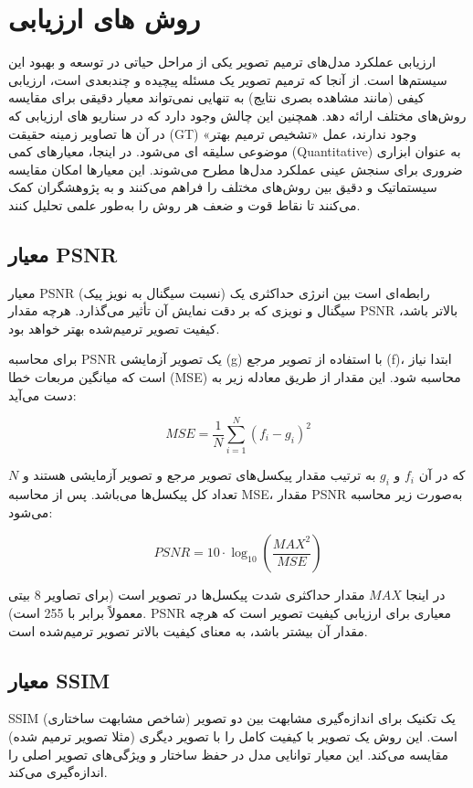 \section{روش های ارزیابی}

ارزیابی عملکرد مدل‌های ترمیم تصویر یکی از مراحل حیاتی در توسعه و بهبود این سیستم‌ها است. از آنجا که ترمیم تصویر یک مسئله پیچیده و چندبعدی است، ارزیابی کیفی (مانند مشاهده بصری نتایج) به تنهایی نمی‌تواند معیار دقیقی برای مقایسه روش‌های مختلف ارائه دهد. همچنین این چالش وجود دارد که در سناریو های ارزیابی که در آن ها تصاویر زمینه حقیقت (GT) وجود ندارند، عمل «تشخیص ترمیم بهتر» موضوعی سلیقه ای می‌شود. در اینجا، معیارهای کمی (Quantitative) به عنوان ابزاری ضروری برای سنجش عینی عملکرد مدل‌ها مطرح می‌شوند. این معیارها امکان مقایسه سیستماتیک و دقیق بین روش‌های مختلف را فراهم می‌کنند و به پژوهشگران کمک می‌کنند تا نقاط قوت و ضعف هر روش را به‌طور علمی تحلیل کنند.
\subsection{معیار PSNR}
معیار PSNR (نسبت سیگنال به نویز پیک) رابطه‌ای است بین انرژی حداکثری یک سیگنال و نویزی که بر دقت نمایش آن تأثیر می‌گذارد. هرچه مقدار PSNR بالاتر باشد، کیفیت تصویر ترمیم‌شده بهتر خواهد بود.

برای محاسبه PSNR یک تصویر آزمایشی (g) با استفاده از تصویر مرجع (f)، ابتدا نیاز است که میانگین مربعات خطا (MSE) محاسبه شود. این مقدار از طریق معادله زیر به دست می‌آید:

\[
MSE = \frac{1}{N} \sum_{i=1}^{N} (f_i - g_i)^2
\]

که در آن $f_i$ و $g_i$ به ترتیب مقدار پیکسل‌های تصویر مرجع و تصویر آزمایشی هستند و $N$ تعداد کل پیکسل‌ها می‌باشد. پس از محاسبه MSE، مقدار PSNR به‌صورت زیر محاسبه می‌شود:

\begin{equation}
	PSNR = 10 \cdot \log_{10}\left(\frac{MAX^2}{MSE}\right)
\end{equation}

در اینجا $MAX$ مقدار حداکثری شدت پیکسل‌ها در تصویر است (برای تصاویر 8 بیتی معمولاً برابر با 255 است). PSNR معیاری برای ارزیابی کیفیت تصویر است که هرچه مقدار آن بیشتر باشد، به معنای کیفیت بالاتر تصویر ترمیم‌شده است.

\subsection{معیار SSIM}

SSIM
(شاخص مشابهت ساختاری) یک تکنیک برای اندازه‌گیری مشابهت بین دو تصویر است. این روش یک تصویر با کیفیت کامل را با تصویر دیگری (مثلا تصویر ترمیم شده) مقایسه می‌کند. این معیار توانایی مدل در حفظ ساختار و ویژگی‌های تصویر اصلی را اندازه‌گیری می‌کند.

